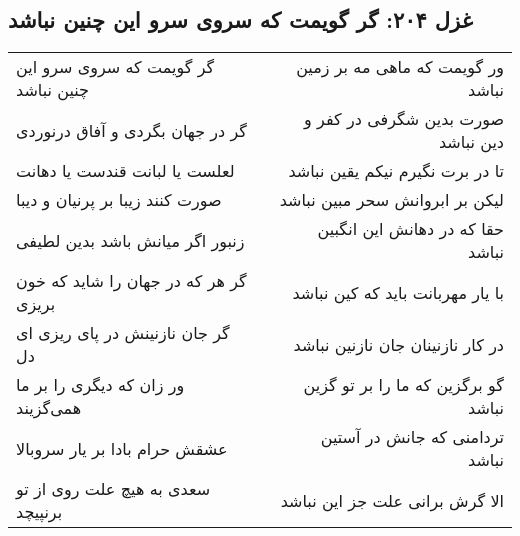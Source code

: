 \begin{center}
\section*{غزل ۲۰۴: گر گویمت که سروی سرو این چنین نباشد}
\label{sec:204}
\begin{longtable}{l p{0.5cm} r}
گر گویمت که سروی سرو این چنین نباشد
&&
ور گویمت که ماهی مه بر زمین نباشد
\\
گر در جهان بگردی و آفاق درنوردی
&&
صورت بدین شگرفی در کفر و دین نباشد
\\
لعلست یا لبانت قندست یا دهانت
&&
تا در برت نگیرم نیکم یقین نباشد
\\
صورت کنند زیبا بر پرنیان و دیبا
&&
لیکن بر ابروانش سحر مبین نباشد
\\
زنبور اگر میانش باشد بدین لطیفی
&&
حقا که در دهانش این انگبین نباشد
\\
گر هر که در جهان را شاید که خون بریزی
&&
با یار مهربانت باید که کین نباشد
\\
گر جان نازنینش در پای ریزی ای دل
&&
در کار نازنینان جان نازنین نباشد
\\
ور زان که دیگری را بر ما همی‌گزیند
&&
گو برگزین که ما را بر تو گزین نباشد
\\
عشقش حرام بادا بر یار سروبالا
&&
تردامنی که جانش در آستین نباشد
\\
سعدی به هیچ علت روی از تو برنپیچد
&&
الا گرش برانی علت جز این نباشد
\\
\end{longtable}
\end{center}
